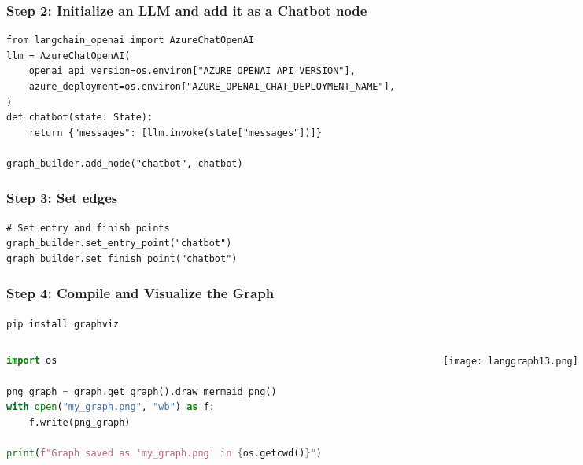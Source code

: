 \begin{frame}[fragile]\frametitle{Step 2: Initialize an LLM and add it as a Chatbot node}


      \begin{lstlisting}
from langchain_openai import AzureChatOpenAI
llm = AzureChatOpenAI(
    openai_api_version=os.environ["AZURE_OPENAI_API_VERSION"],
    azure_deployment=os.environ["AZURE_OPENAI_CHAT_DEPLOYMENT_NAME"],
)
def chatbot(state: State):
    return {"messages": [llm.invoke(state["messages"])]}
	
graph_builder.add_node("chatbot", chatbot)
      \end{lstlisting}
\end{frame}

\begin{frame}[fragile]\frametitle{Step 3: Set edges}

      \begin{lstlisting}
# Set entry and finish points
graph_builder.set_entry_point("chatbot")
graph_builder.set_finish_point("chatbot")
      \end{lstlisting}
\end{frame}

\begin{frame}[fragile]\frametitle{Step 4: Compile and Visualize the Graph}

\lstinline|pip install graphviz|

\begin{columns}
    \begin{column}[T]{0.8\linewidth}
      \begin{lstlisting}[language=Python, basicstyle=\small]
import os

png_graph = graph.get_graph().draw_mermaid_png()
with open("my_graph.png", "wb") as f:
    f.write(png_graph)

print(f"Graph saved as 'my_graph.png' in {os.getcwd()}")
      \end{lstlisting}

    \end{column}
    \begin{column}[T]{0.2\linewidth}
\begin{center}
\texttt{[image: langgraph13.png]}
\end{center}
    \end{column}
  \end{columns}
  
\end{frame}

